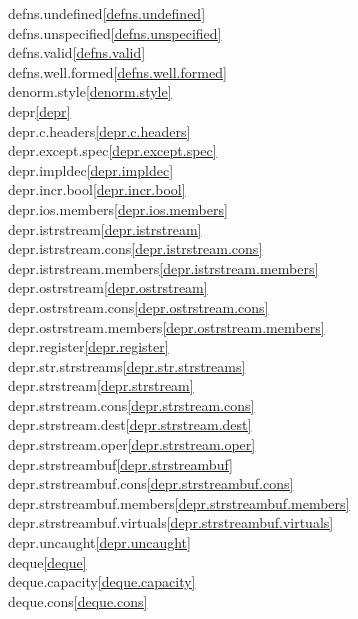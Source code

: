 \begin{multicols}{2}
defns.undefined\quad\ref{defns.undefined}\\
defns.unspecified\quad\ref{defns.unspecified}\\
defns.valid\quad\ref{defns.valid}\\
defns.well.formed\quad\ref{defns.well.formed}\\
denorm.style\quad\ref{denorm.style}\\
depr\quad\ref{depr}\\
depr.c.headers\quad\ref{depr.c.headers}\\
depr.except.spec\quad\ref{depr.except.spec}\\
depr.impldec\quad\ref{depr.impldec}\\
depr.incr.bool\quad\ref{depr.incr.bool}\\
depr.ios.members\quad\ref{depr.ios.members}\\
depr.istrstream\quad\ref{depr.istrstream}\\
depr.istrstream.cons\quad\ref{depr.istrstream.cons}\\
depr.istrstream.members\quad\ref{depr.istrstream.members}\\
depr.ostrstream\quad\ref{depr.ostrstream}\\
depr.ostrstream.cons\quad\ref{depr.ostrstream.cons}\\
depr.ostrstream.members\quad\ref{depr.ostrstream.members}\\
depr.register\quad\ref{depr.register}\\
depr.str.strstreams\quad\ref{depr.str.strstreams}\\
depr.strstream\quad\ref{depr.strstream}\\
depr.strstream.cons\quad\ref{depr.strstream.cons}\\
depr.strstream.dest\quad\ref{depr.strstream.dest}\\
depr.strstream.oper\quad\ref{depr.strstream.oper}\\
depr.strstreambuf\quad\ref{depr.strstreambuf}\\
depr.strstreambuf.cons\quad\ref{depr.strstreambuf.cons}\\
depr.strstreambuf.members\quad\ref{depr.strstreambuf.members}\\
depr.strstreambuf.virtuals\quad\ref{depr.strstreambuf.virtuals}\\
depr.uncaught\quad\ref{depr.uncaught}\\
deque\quad\ref{deque}\\
deque.capacity\quad\ref{deque.capacity}\\
deque.cons\quad\ref{deque.cons}\\

\end{multicols}
